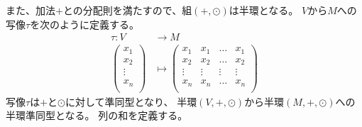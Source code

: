 また、加法$+$との分配則を満たすので、組$(+,\odot)$は半環となる。
$V$から$M$への写像$\tau$を次のように定義する。
\begin{equation}\begin{split}
	\tau: V &\to M \\
		\begin{pmatrix}
			x_1 \\ 
			x_2 \\ 
			\vdots \\ 
			x_n \\
		\end{pmatrix} &\mapsto 
		\begin{pmatrix}
			x_1 & x_1 & \dots & x_1 \\ 
			x_2 & x_2 & \dots & x_2 \\ 
			\vdots & \vdots & \vdots & \vdots \\ 
			x_n & x_n & \dots & x_n \\ 
		\end{pmatrix} 
\end{split}\end{equation}
写像$\tau$は$+$と$\odot$に対して準同型となり、
半環$(V,+,\odot)$から半環$(M,+,\odot)$への半環準同型となる。
列の和を定義する。

